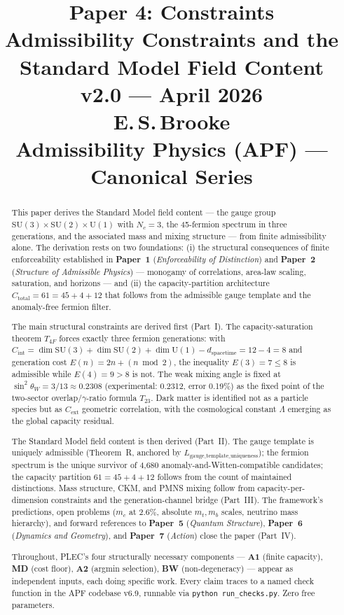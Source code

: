 \documentclass[11pt]{article}
\title{
  \textbf{Paper 4: Constraints}\\
  \large Admissibility Constraints and the Standard Model Field Content\\
  \normalsize v2.0 --- April 2026\\
  \normalsize E.\,S.\,Brooke\\
  Admissibility Physics (APF) --- Canonical Series
}
\author{}
\date{}
\newcommand{\SU}{\mathrm{SU}}
\newcommand{\Un}{\mathrm{U}}
\newcommand{\Aone}{\textbf{A1}}
\newcommand{\Atwo}{\textbf{A2}}
\newcommand{\MD}{\textbf{MD}}
\newcommand{\BW}{\textbf{BW}}
\newcommand{\paperref}[2]{\textbf{Paper~#1} (\textit{#2})}
\theoremstyle{definition}
\begin{document}
\maketitle

\begin{abstract}
\noindent
This paper derives the Standard Model field content --- the gauge group $\SU(3) \times \SU(2) \times \Un(1)$ with $N_c = 3$, the 45-fermion spectrum in three generations, and the associated mass and mixing structure --- from finite admissibility alone. The derivation rests on two foundations: (i) the structural consequences of finite enforceability established in \paperref{1}{Enforceability of Distinction} and \paperref{2}{Structure of Admissible Physics} --- monogamy of correlations, area-law scaling, saturation, and horizons --- and (ii) the capacity-partition architecture $C_{\mathrm{total}} = 61 = 45 + 4 + 12$ that follows from the admissible gauge template and the anomaly-free fermion filter.

The main structural constraints are derived first (Part~I). The capacity-saturation theorem $T_{4F}$ forces exactly three fermion generations: with $C_{\mathrm{int}} = \dim\SU(3) + \dim\SU(2) + \dim\Un(1) - d_{\mathrm{spacetime}} = 12 - 4 = 8$ and generation cost $E(n) = 2n + (n \bmod 2)$, the inequality $E(3) = 7 \leq 8$ is admissible while $E(4) = 9 > 8$ is not. The weak mixing angle is fixed at $\sin^2\theta_W = 3/13 \approx 0.2308$ (experimental: 0.2312, error 0.19\%) as the fixed point of the two-sector overlap/$\gamma$-ratio formula $T_{23}$. Dark matter is identified not as a particle species but as $C_{\mathrm{ext}}$ geometric correlation, with the cosmological constant $\Lambda$ emerging as the global capacity residual.

The Standard Model field content is then derived (Part~II). The gauge template is uniquely admissible (Theorem~R, anchored by $L_{\text{gauge\_template\_uniqueness}}$); the fermion spectrum is the unique survivor of 4,680 anomaly-and-Witten-compatible candidates; the capacity partition $61 = 45 + 4 + 12$ follows from the count of maintained distinctions. Mass structure, CKM, and PMNS mixing follow from capacity-per-dimension constraints and the generation-channel bridge (Part~III). The framework's predictions, open problems ($m_c$ at 2.6\%, absolute $m_t, m_b$ scales, neutrino mass hierarchy), and forward references to \paperref{5}{Quantum Structure}, \paperref{6}{Dynamics and Geometry}, and \paperref{7}{Action} close the paper (Part~IV).

Throughout, PLEC's four structurally necessary components --- \Aone{} (finite capacity), \MD{} (cost floor), \Atwo{} (argmin selection), \BW{} (non-degeneracy) --- appear as independent inputs, each doing specific work. Every claim traces to a named check function in the APF codebase v6.9, runnable via \texttt{python run\_checks.py}. Zero free parameters.
\end{abstract}
\end{document}
